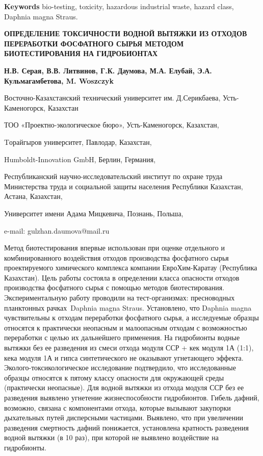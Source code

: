 {\bfseries Keywords} bio-testing, toxicity, hazardous industrial waste,
hazard class, Daphnia magna Straus.

\begin{header}
{\bfseries ОПРЕДЕЛЕНИЕ ТОКСИЧНОСТИ ВОДНОЙ ВЫТЯЖКИ ИЗ ОТХОДОВ ПЕРЕРАБОТКИ ФОСФАТНОГО СЫРЬЯ МЕТОДОМ БИОТЕСТИРОВАНИЯ НА ГИДРОБИОНТАХ}

{\bfseries
{}Н.В. Серая,
В.В. Литвинов,
Г.К. Даумова\envelope,
М.А. Елубай,
Э.А. Кульмагамбетова,
M. Woszczyk
}
\end{header}

\begin{affil}
Восточно-Казахстанский технический университет им. Д.Серикбаева, Усть-Каменогорск, Казахстан

ТОО «Проектно-экологическое бюро», Усть-Каменогорск, Казахстан,

Tорайгыров университет, Павлодар, Казахстан,

Humboldt-Innovation GmbH, Берлин, Германия,

Республиканский научно-исследовательский институт по охране труда Министерства труда и социальной защиты населения Республики Казахстан, Астана, Казахстан,

Университет имени Адама Мицкевича, Познань, Польша,

e-mail: gulzhan.daumova@mail.ru
\end{affil}

Метод биотестирования впервые использован при оценке отдельного и
комбинированного воздействия отходов производства фосфатного сырья
проектируемого химического комплекса компании ЕвроХим-Каратау
(Республика Казахстан). Цель работы состояла в определении класса
опасности отходов производства фосфатного сырья с помощью методов
биотестирования. Экспериментальную работу проводили на тест-организмах:
пресноводных планктонных рачках~Daphnia magna Straus. Установлено, что
Daphnia magna чувствительны к отходам переработки фосфатного сырья, а
исследуемые образцы относятся к практически неопасным и малоопасным
отходам с возможностью переработки с целью их дальнейшего применения. На
гидробионты водные вытяжки без ее разведения из смеси отхода модуля ССР
+ кек модуля 1А (1:1), кека модуля 1А и гипса синтетического не
оказывают угнетающего эффекта. Эколого-токсикологическое исследование
подтвердило, что исследованные образцы относятся к пятому классу
опасности для окружающей среды (практически неопасные). Для водной
вытяжки из отхода модуля ССР без ее разведения выявлено угнетение
жизнеспособности гидробионтов. Гибель дафний, возможно, связана с
компонентами отхода, которые вызывают закупорки дыхательных путей
дисперсными частицами. Выявлено, что при увеличении разведения
смертность дафний понижается, установлена кратность разведения водной
вытяжки (в 10 раз), при которой не выявлено воздействие на гидробионты.

